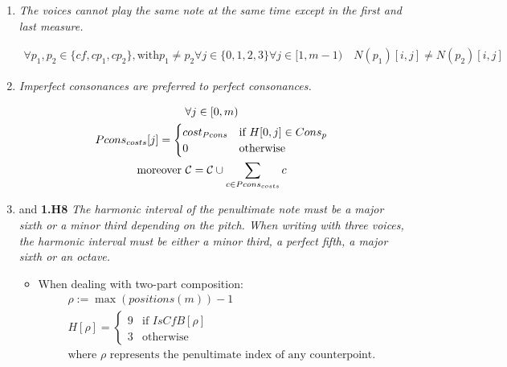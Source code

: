 \begin{enumerate}[wide, label=\bfseries 1.H\arabic*]
\item\label{rule:no-unison-appendix}{\textit{The voices cannot play the same note at the same time except in the first and last measure.}}

\begin{equation}
    \begin{gathered}
        \forall p_1, p_2 \in \{cf, cp_1, cp_2\}, \text{with} p_1 \neq p_2 \forall j \in \{0, 1, 2, 3\} \forall j \in [1, m-1) \quad
        N(p_1)[i, j] \neq N(p_2)[i, j]
    \end{gathered}
\end{equation}

\item \label{rule:prefer-imp-to-perf-appendix}{\textit{Imperfect consonances are preferred to perfect consonances.}}


\begin{equation}
    \begin{gathered}
        \forall j \in [0, m)\\
        Pcons_{costs}[j] = \begin{cases}
            cost_{Pcons} & \text{if } H[0, j] \in Cons_{p}\\
            0 & \text{otherwise}
        \end{cases}\\
        \text{moreover } \mathcal{C} = \mathcal{C} \cup \sum _{c \in Pcons_{costs}} c
    \end{gathered}
\end{equation}

\item{and \textbf{1.H8} \textit{The harmonic interval of the penultimate note must be a major sixth or a minor third depending on the \cfs pitch. When writing with three voices, the harmonic interval must be either a minor third, a perfect fifth, a major sixth or an octave.}}\label{rule:penult-interval-2v}

\addtocounter{enumi}{1} 
\begin{itemize} \item  When dealing with two-part composition:\begin{equation}
    \begin{gathered}
        \rho := \max (positions(m)) - 1\\
        H[\rho] = \begin{cases}
            9 & \text{if } \mathit{IsCfB}[\rho]\\
            3 & \text{otherwise}
        \end{cases}\\
        \text{where } \rho \text{ represents the penultimate index of any counterpoint.}
    \end{gathered}
\end{equation}


\end{itemize}
\end{enumerate}
